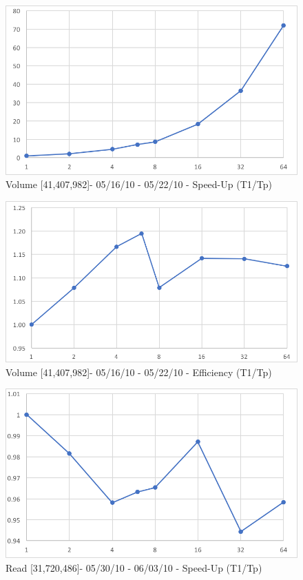 \documentclass[12pt]{article} %
\begin{document}
\begin{figure}[htb]
\caption{Volume [41,407,982]- 05/16/10 - 05/22/10 - Speed-Up (T1/Tp)}\label{fig:benchmark01}
\centering
\includegraphics[width=15cm,keepaspectratio]{imgs/img17.png}
\end{figure} 

\begin{figure}[htb]
\caption{Volume [41,407,982]- 05/16/10 - 05/22/10 - Efficiency (T1/Tp)}\label{fig:benchmark01}
\centering
\includegraphics[width=15cm,keepaspectratio]{imgs/img18.png}
\end{figure} 



\begin{figure}[htb]
\caption{Read [31,720,486]- 05/30/10 - 06/03/10 - Speed-Up (T1/Tp)}\label{fig:benchmark01}
\centering
\includegraphics[width=15cm,keepaspectratio]{imgs/img13.png}
\end{figure} 
\end{document}
